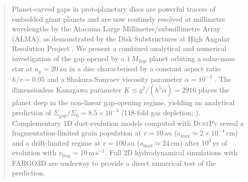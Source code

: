 %
%


\begin{abstract}
Planet-carved gaps in protoplanetary discs are powerful tracers of embedded
giant planets and are now routinely resolved at millimetre wavelengths by
the Atacama Large Millimetre/submillimetre Array (ALMA), as demonstrated by
the Disk Substructures at High Angular Resolution Project
\citep[DSHARP;][]{Andrews2018, Huang2018}.
We present a combined analytical and numerical investigation of the gap
opened by a $1\,M_\mathrm{Jup}$ planet orbiting a solar-mass star at
$a_\mathrm{p} = 20\,\mathrm{au}$ in a disc characterised by a constant
aspect ratio $h/r = 0.05$ and a Shakura-Sunyaev viscosity parameter
$\alpha = 10^{-3}$ \citep{ShakuraSunyaev1973}.
The dimensionless Kanagawa parameter $K \equiv q^2/(h^5\alpha) = 2916$
places the planet deep in the non-linear gap-opening regime, yielding an
analytical prediction of $\Sigma_\mathrm{gap}/\Sigma_0 = 8.5\times10^{-3}$
(118-fold gas depletion; \citealt{Kanagawa2016}).
Complementary 1D dust-evolution models computed with \textsc{DustPy}
\citep{Stammler2022} reveal a fragmentation-limited grain population at
$r = 10\,\mathrm{au}$ ($a_\mathrm{max} \simeq 2\times10^{-4}\,\mathrm{cm}$)
and a drift-limited regime at $r = 100\,\mathrm{au}$
($a_\mathrm{max} \simeq 24\,\mathrm{cm}$) after $10^3\,\mathrm{yr}$ of
evolution with $v_\mathrm{frag} = 10\,\mathrm{m\,s}^{-1}$.
Full 2D hydrodynamical simulations with \textsc{FARGO3D}
\citep{BenitezLlambay2016} are underway to provide a direct numerical test
of the \citet{Kanagawa2016} prediction.
\end{abstract}

